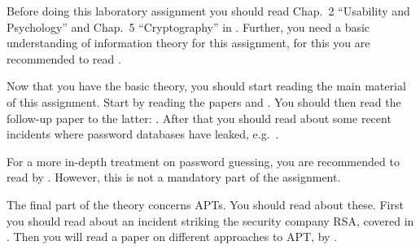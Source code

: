 Before doing this laboratory assignment you should read Chap.~2 ``Usability and 
Psychology'' and Chap.~5 ``Cryptography'' in  
\cite{Anderson2008sea}.
Further, you need a basic understanding of information theory 
\cite{Shannon1948amt} for this assignment, for this you are recommended to read 
 \cite{Ueltschi2013se}.

Now that you have the basic theory, you should start reading the main material 
of this assignment.
Start by reading the papers  \cite{Kuo2006hso} and 
 \cite{Komanduri2011opa}.
You should then read the follow-up paper to the latter: 
 \cite{Komanduri2014can}.
After that you should read about some recent incidents where password databases 
have leaked, 
e.g.~\cite{Hunt2011abs,Cluley2012twp,Oberheide2010bao,Cubrilovic2009rhf}.

For a more in-depth treatment on password guessing, you are recommended to read 
 by \citet{Bonneau2012ghs}.
However, this is not a mandatory part of the assignment.

The final part of the theory concerns \acp{APT}.
You should read about these.
First you should read about an incident striking the security company RSA, 
covered in  \cite{Fisher2011rsa}.
Then you will read a paper on different approaches to \ac{APT}, 
 by \citet{Juels2012sha}.
